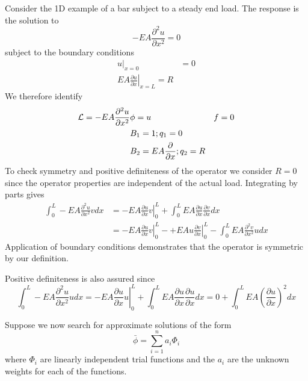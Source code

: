 \documentclass[10pt]{article}
\begin{document}
	 Consider the 1D example of a bar subject to a steady end load. The
	 response is the solution to 
	 	\begin{equation}
	 		-EA\frac{\partial^2 u}{\partial x^2} = 0
	 	\end{equation} 
	 subject to the boundary conditions
	 	\begin{equation}
	 		\begin{split}
	 			\left. u \right|_{x=0} & = 0 \\
	 			\left. EA\frac{\partial u}{\partial x} \right|_{x=L} = R
	 		\end{split}
	 	\end{equation}
	 We therefore identify
	 	\begin{eqnarray*}
	 		{\cal{L}}= -EA\frac{\partial^2 u}{\partial x^2} & \phi = u & f = 0 \\
	 		& B_1 = 1 ; q_1 = 0 & \\
	 		& B_2 =  EA\frac{\partial }{\partial x}; q_2 = R & 
	 	\end{eqnarray*}
	 To check symmetry and positive definiteness of the operator we
	 consider $R=0$ since the operator properties are independent of the
	 actual load. Integrating by parts gives
	 	\begin{equation}
	 		\begin{split}
	 		\int_0^L-EA\frac{\partial^2 u}{\partial x^2} v dx & = 	
	 			- \left. EA\frac{\partial u}{\partial x} v \right|_0^L + \int_0^L EA \frac{\partial u}{\partial x} \frac{\partial v}{\partial x} dx \\
	 			 &= - \left. EA\frac{\partial u}{\partial x} v \right|_0^L  - \left. + EA u \frac{\partial v}{\partial x}  \right|_0^L
	 			 - \int_0^L EA\frac{\partial^2 v}{\partial x^2} u dx
	 		\end{split}	
	 	\end{equation}
	 Application of boundary conditions demonstrates that the operator is
	 symmetric by our definition.
	 
	 Positive definiteness is also assured since
		 \begin{equation}
		 		\int_0^L-EA\frac{\partial^2 u}{\partial x^2} u dx = 	
		 			- \left. EA\frac{\partial u}{\partial x} u \right|_0^L + \int_0^L EA \frac{\partial u}{\partial x} \frac{\partial u}{\partial x} dx 		=
		 			0 + \int_0^L EA \left(\frac{\partial u}{\partial x}\right)^2 dx 		
		 \end{equation}
	
	Suppose we now search for approximate solutions of the form
		\begin{equation}
			\bar{\phi} = \sum_{i=1}^{n} a_i \Phi_i	
		\end{equation}
	where $\Phi_i$ are linearly independent trial functions and the $a_i$ are
	the unknown weights for each of the functions.
	
\end{document}
